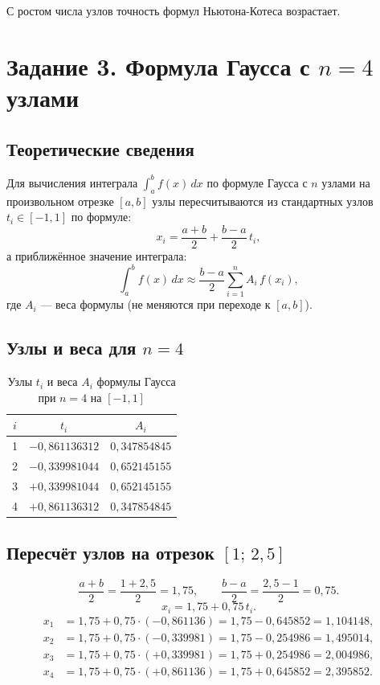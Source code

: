 \documentclass[a4paper, final]{article}
\begin{document}
С ростом числа узлов точность формул Ньютона-Котеса возрастает.

\newpage

\section{Задание 3. Формула Гаусса с $n = 4$ узлами}

\subsection{Теоретические сведения}

Для вычисления интеграла $\displaystyle\int_a^b f(x)\,dx$ по формуле Гаусса с $n$
узлами на произвольном отрезке $[a,b]$ узлы пересчитываются из стандартных
узлов $t_i \in [-1,1]$ по формуле:
\[
x_i = \frac{a+b}{2} + \frac{b-a}{2}\,t_i,
\]
а приближённое значение интеграла:
\[
\int_a^b f(x)\,dx \approx \frac{b-a}{2}\sum_{i=1}^{n} A_i\,f(x_i),
\]
где $A_i$ --- веса формулы (не меняются при переходе к $[a,b]$).

\subsection{Узлы и веса для $n = 4$}

\begin{table}[h!]
\centering
\caption{Узлы $t_i$ и веса $A_i$ формулы Гаусса при $n=4$ на $[-1,1]$}
\label{tab:gauss_tab}
\begin{tabular}{|c|c|c|}
\hline
$i$ & $t_i$ & $A_i$ \\
\hline
1 & $-0{,}861136312$ & $0{,}347854845$ \\
2 & $-0{,}339981044$ & $0{,}652145155$ \\
3 & $+0{,}339981044$ & $0{,}652145155$ \\
4 & $+0{,}861136312$ & $0{,}347854845$ \\
\hline
\end{tabular}
\end{table}

\subsection{Пересчёт узлов на отрезок $[1;\,2{,}5]$}

\[
\frac{a+b}{2} = \frac{1+2{,}5}{2} = 1{,}75, \qquad
\frac{b-a}{2} = \frac{2{,}5-1}{2} = 0{,}75.
\]
\[
x_i = 1{,}75 + 0{,}75\,t_i.
\]
\begin{align*}
x_1 &= 1{,}75 + 0{,}75\cdot(-0{,}861136) = 1{,}75 - 0{,}645852 = 1{,}104148,\\
x_2 &= 1{,}75 + 0{,}75\cdot(-0{,}339981) = 1{,}75 - 0{,}254986 = 1{,}495014,\\
x_3 &= 1{,}75 + 0{,}75\cdot(+0{,}339981) = 1{,}75 + 0{,}254986 = 2{,}004986,\\
x_4 &= 1{,}75 + 0{,}75\cdot(+0{,}861136) = 1{,}75 + 0{,}645852 = 2{,}395852.
\end{align*}
\end{document}
